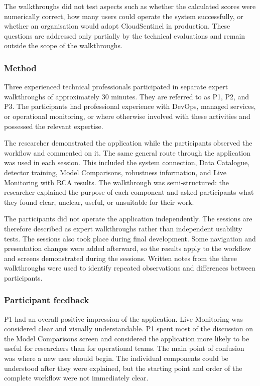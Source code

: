 The walkthroughs did not test aspects such as whether the calculated scores were numerically correct, how many users could operate the system successfully, or whether an organisation would adopt CloudSentinel in production. These questions are addressed only partially by the technical evaluations and remain outside the scope of the walkthroughs.

\subsubsection{Method}

Three experienced technical professionals participated in separate expert walkthroughs of approximately 30 minutes. They are referred to as P1, P2, and P3. The participants had professional experience with DevOps, managed services, or operational monitoring, or where otherwise involved with these activities and possessed the relevant expertise.

The researcher demonstrated the application while the participants observed the workflow and commented on it. The same general route through the application was used in each session. This included the system connection, Data Catalogue, detector training, Model Comparisons, robustness information, and Live Monitoring with RCA results. The walkthrough was semi-structured: the researcher explained the purpose of each component and asked participants what they found clear, unclear, useful, or unsuitable for their work.

The participants did not operate the application independently. The sessions are therefore described as expert walkthroughs rather than independent usability tests. The sessions also took place during final development. Some navigation and presentation changes were added afterward, so the results apply to the workflow and screens demonstrated during the sessions. Written notes from the three walkthroughs were used to identify repeated observations and differences between participants.

\subsubsection{Participant feedback}

P1 had an overall positive impression of the application. Live Monitoring was considered clear and visually understandable. P1 spent most of the discussion on the Model Comparisons screen and considered the application more likely to be useful for researchers than for operational teams. The main point of confusion was where a new user should begin. The individual components could be understood after they were explained, but the starting point and order of the complete workflow were not immediately clear.

